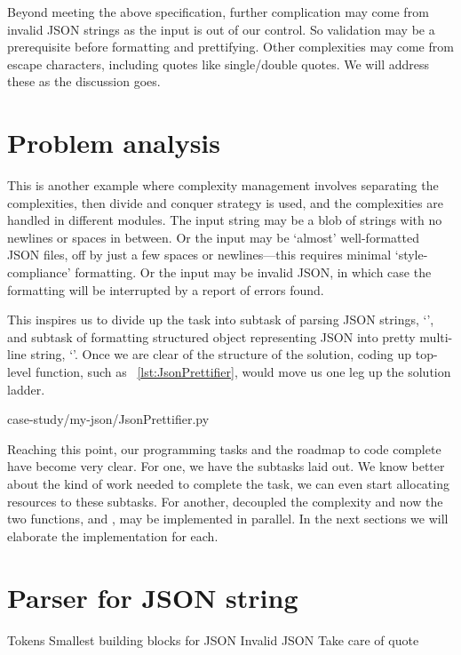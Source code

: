 Beyond meeting the above specification, further complication may come from invalid JSON strings
as the input is out of our control.
So validation may be a prerequisite before formatting and prettifying.
Other complexities may come from escape characters, including quotes like single/double quotes.
We will address these as the discussion goes.

\section{Problem analysis}\label{sec:outlineOfTheAlgorithm.Json}

This is another example where complexity management involves separating the complexities,
then divide and conquer strategy is used, and the complexities are handled in
different modules.
The input string may be a blob of strings with no newlines or spaces in between.
Or the input may be `almost' well-formatted JSON files, off by just a few spaces or
newlines---this requires minimal `style-compliance' formatting.
Or the input may be invalid JSON, in which case the formatting will be interrupted
by a report of errors found.

This inspires us to divide up the task into subtask of parsing JSON strings,
`', and subtask of formatting
structured object representing JSON into pretty multi-line string, `'.
Once we are clear of the structure of the solution, coding up top-level function,
such as ~\autoref{lst:JsonPrettifier}, would
move us one leg up the solution ladder.


{case-study/my-json/JsonPrettifier.py}

Reaching this point, our programming tasks and the roadmap to code complete have become very clear.
For one, we have the subtasks laid out.
We know better about the kind of work needed to complete the task, we can even start allocating
resources to these subtasks.
For another, decoupled the complexity and now the two functions, 
and , may be implemented in parallel.
In the next sections we will elaborate the implementation for each.

\section{Parser for JSON string}\label{sec:jsonparser}

Tokens
Smallest building blocks for JSON
Invalid JSON
Take care of quote

